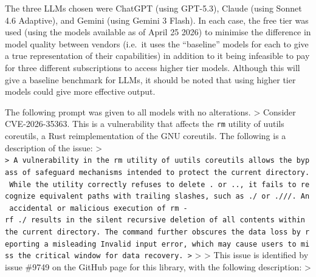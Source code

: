The three LLMs chosen were ChatGPT (using GPT-5.3), Claude (using Sonnet
4.6 Adaptive), and Gemini (using Gemini 3 Flash). In each case, the free
tier was used (using the models available as of April 25 2026) to
minimise the difference in model quality between vendors (i.e.~it uses
the ``baseline'' models for each to give a true representation of their
capabilities) in addition to it being infeasible to pay for three
different subscriptions to access higher tier models. Although this will
give a baseline benchmark for LLMs, it should be noted that using higher
tier models could give more effective output.

The following prompt was given to all models with no alterations.
\textgreater{} Consider CVE-2026-35363. This is a vulnerability that
affects the \texttt{rm} utility of uutils coreutils, a Rust
reimplementation of the GNU coreutils. The following is a description of
the issue: \textgreater{}
\texttt{\textgreater{}\ A\ vulnerability\ in\ the\ rm\ utility\ of\ uutils\ coreutils\ allows\ the\ bypass\ of\ safeguard\ mechanisms\ intended\ to\ protect\ the\ current\ directory.\ While\ the\ utility\ correctly\ refuses\ to\ delete\ .\ or\ ..,\ it\ fails\ to\ recognize\ equivalent\ paths\ with\ trailing\ slashes,\ such\ as\ ./\ or\ .///.\ An\ accidental\ or\ malicious\ execution\ of\ rm\ -rf\ ./\ results\ in\ the\ silent\ recursive\ deletion\ of\ all\ contents\ within\ the\ current\ directory.\ The\ command\ further\ obscures\ the\ data\ loss\ by\ reporting\ a\ misleading\ \textquotesingle{}Invalid\ input\textquotesingle{}\ error,\ which\ may\ cause\ users\ to\ miss\ the\ critical\ window\ for\ data\ recovery.\ \textgreater{}}
\textgreater{} \textgreater{} This issue is identified by issue \#9749
on the GitHub page for this library, with the following description:
\textgreater{}

